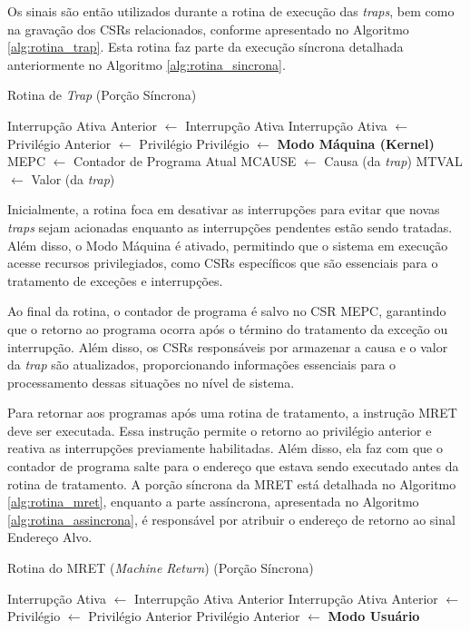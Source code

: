 \documentclass[
	12pt,				%
	openright,			%
	oneside,			%
	a4paper,			%
	english,			%
	french,				%
	spanish,			%
	brazil,				%
	]{abntex2}
\begin{document}
Os sinais são então utilizados durante a rotina de execução das \textit{traps}, bem como na gravação dos CSRs relacionados, conforme apresentado no Algoritmo \ref{alg:rotina_trap}. Esta rotina faz parte da execução síncrona detalhada anteriormente no Algoritmo \ref{alg:rotina_sincrona}. 

\begin{algorithm}[h!]
\caption{Rotina de \textit{Trap} (Porção Síncrona)}
\label{alg:rotina_trap}
\begin{algorithmic}[1]
    \STATE Interrupção Ativa Anterior $\leftarrow$ Interrupção Ativa
    \STATE Interrupção Ativa $\leftarrow$ \FALSE
    \STATE Privilégio Anterior $\leftarrow$ Privilégio
    \STATE Privilégio $\leftarrow$ \textbf{Modo Máquina (Kernel)}
    \STATE MEPC $\leftarrow$ Contador de Programa Atual
    \STATE MCAUSE $\leftarrow$ Causa (da \textit{trap})
    \STATE MTVAL $\leftarrow$ Valor (da \textit{trap})
\end{algorithmic}
\end{algorithm}

Inicialmente, a rotina foca em desativar as interrupções para evitar que novas \textit{traps} sejam acionadas enquanto as interrupções pendentes estão sendo tratadas. Além disso, o Modo Máquina é ativado, permitindo que o sistema em execução acesse recursos privilegiados, como CSRs específicos que são essenciais para o tratamento de exceções e interrupções.

Ao final da rotina, o contador de programa é salvo no CSR MEPC, garantindo que o retorno ao programa ocorra após o término do tratamento da exceção ou interrupção. Além disso, os CSRs responsáveis por armazenar a causa e o valor da \textit{trap} são atualizados, proporcionando informações essenciais para o processamento dessas situações no nível de sistema.

Para retornar aos programas após uma rotina de tratamento, a instrução MRET deve ser executada. Essa instrução permite o retorno ao privilégio anterior e reativa as interrupções previamente habilitadas. Além disso, ela faz com que o contador de programa salte para o endereço que estava sendo executado antes da rotina de tratamento. A porção síncrona da MRET está detalhada no Algoritmo \ref{alg:rotina_mret}, enquanto a parte assíncrona, apresentada no Algoritmo \ref{alg:rotina_assincrona}, é responsável por atribuir o endereço de retorno ao sinal Endereço Alvo.

\begin{algorithm}[h!]
\caption{Rotina do MRET (\textit{Machine Return}) (Porção Síncrona)}
\label{alg:rotina_mret}
\begin{algorithmic}[1]
    \STATE Interrupção Ativa $\leftarrow$ Interrupção Ativa Anterior
    \STATE Interrupção Ativa Anterior $\leftarrow$ \TRUE
    \STATE Privilégio $\leftarrow$ Privilégio Anterior
    \STATE Privilégio Anterior $\leftarrow$ \textbf{Modo Usuário}
\end{algorithmic}
\end{algorithm}
\end{document}
